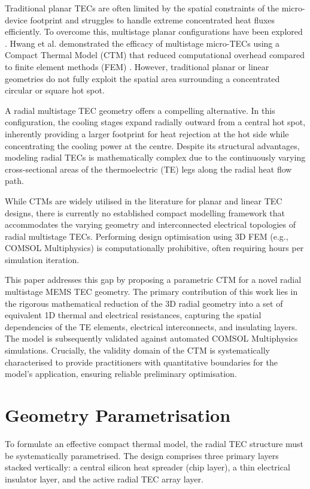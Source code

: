\documentclass[conference,a4paper]{IEEEtran}
\begin{document}
Traditional planar TECs are often limited by the spatial constraints of the micro-device footprint and struggles to handle extreme concentrated heat fluxes efficiently. To overcome this, multistage planar configurations have been explored \cite{hwang_planar}. Hwang et al. demonstrated the efficacy of multistage micro-TECs using a Compact Thermal Model (CTM) that reduced computational overhead compared to finite element methods (FEM) \cite{hwang_planar}. However, traditional planar or linear geometries do not fully exploit the spatial area surrounding a concentrated circular or square hot spot.

A radial multistage TEC geometry offers a compelling alternative. In this configuration, the cooling stages expand radially outward from a central hot spot, inherently providing a larger footprint for heat rejection at the hot side while concentrating the cooling power at the centre. Despite its structural advantages, modeling radial TECs is mathematically complex due to the continuously varying cross-sectional areas of the thermoelectric (TE) legs along the radial heat flow path.

While CTMs are widely utilised in the literature for planar and linear TEC designs, there is currently no established compact modelling framework that accommodates the varying geometry and interconnected electrical topologies of radial multistage TECs. Performing design optimisation using 3D FEM (e.g., COMSOL Multiphysics) is computationally prohibitive, often requiring hours per simulation iteration.

This paper addresses this gap by proposing a parametric CTM for a novel radial multistage MEMS TEC geometry. The primary contribution of this work lies in the rigorous mathematical reduction of the 3D radial geometry into a set of equivalent 1D thermal and electrical resistances, capturing the spatial dependencies of the TE elements, electrical interconnects, and insulating layers. The model is subsequently validated against automated COMSOL Multiphysics simulations. Crucially, the validity domain of the CTM is systematically characterised to provide practitioners with quantitative boundaries for the model's application, ensuring reliable preliminary optimisation.

\section{Geometry Parametrisation}

To formulate an effective compact thermal model, the radial TEC structure must be systematically parametrised. The design comprises three primary layers stacked vertically: a central silicon heat spreader (chip layer), a thin electrical insulator layer, and the active radial TEC array layer.
\end{document}
